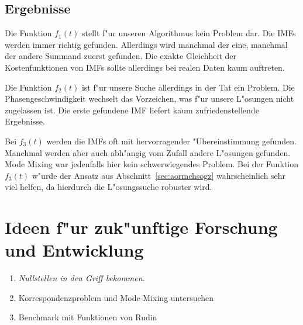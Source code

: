 \documentclass[a4paper]{scrartcl}
\begin{document}
\subsection{Ergebnisse}

Die Funktion $f_1(t)$ stellt f"ur unseren Algorithmus kein Problem dar. Die IMFs werden immer richtig gefunden. Allerdings wird manchmal der eine, manchmal der andere Summand zuerst gefunden. Die exakte Gleichheit der Kostenfunktionen von IMFs sollte allerdings bei realen Daten kaum auftreten. 

Die Funktion $f_2(t)$ ist f"ur unsere Suche allerdings in der Tat ein Problem. Die Phasengeschwindigkeit wechselt das Vorzeichen, was f"ur unsere L"osungen nicht zugelassen ist. Die erste gefundene IMF liefert kaum zufriedenstellende Ergebnisse. 

Bei $f_3(t)$ werden die IMFs oft mit hervorragender "Ubereinstimmung gefunden. Manchmal werden aber auch abh"angig vom Zufall andere L"osungen gefunden. Mode Mixing war jedenfalls hier kein schwerwiegendes Problem. Bei der Funktion $f_3(t)$ w"urde der Ansatz aus Abschnitt~\ref{sec:aormchsogz} wahrscheinlich sehr viel helfen, da hierdurch die L"osungssuche robuster wird. 


\section{Ideen f"ur zuk"unftige Forschung und Entwicklung}

\begin{enumerate}
\item {\em Nullstellen in den Griff bekommen.} 
\item Korrespondenzproblem und Mode-Mixing untersuchen
\item Benchmark mit Funktionen von Rudin
\end{enumerate}
\end{document}
